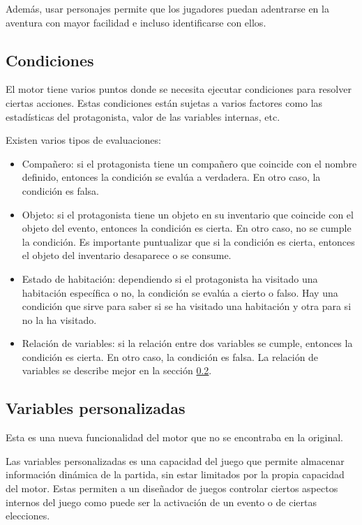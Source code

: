 Además, usar personajes permite que los jugadores puedan adentrarse en la aventura con mayor facilidad e incluso identificarse con ellos.

\subsection{Condiciones} \label{conditionsSubsection}
El motor tiene varios puntos donde se necesita ejecutar condiciones para resolver ciertas acciones. Estas condiciones están sujetas a varios factores como las estadísticas del protagonista, valor de las variables internas, etc.

Existen varios tipos de evaluaciones:
\begin{itemize}
	\item Compañero: si el protagonista tiene un compañero que coincide con el nombre definido, entonces la condición se evalúa a verdadera. En otro caso, la condición es falsa.
	\item Objeto: si el protagonista tiene un objeto en su inventario que coincide con el objeto del evento, entonces la condición es cierta. En otro caso, no se cumple la condición. Es importante puntualizar que si la condición es cierta, entonces el objeto del inventario desaparece o se consume.
	\item Estado de habitación: dependiendo si el protagonista ha visitado una habitación específica o no, la condición se evalúa a cierto o falso. Hay una condición que sirve para saber si se ha visitado una habitación y otra para si no la ha visitado.
	\item Relación de variables: si la relación entre dos variables se cumple, entonces la condición es cierta. En otro caso, la condición es falsa. La relación de variables se describe mejor en la sección \ref{variablesSection}.
\end{itemize}

\subsection{Variables personalizadas} \label{variablesSection}

Esta es una nueva funcionalidad del motor que no se encontraba en la original.

Las variables personalizadas es una capacidad del juego que permite almacenar información dinámica de la partida, sin estar limitados por la propia capacidad del motor. Estas permiten a un diseñador de juegos controlar ciertos aspectos internos del juego como puede ser la activación de un evento o de ciertas elecciones.


